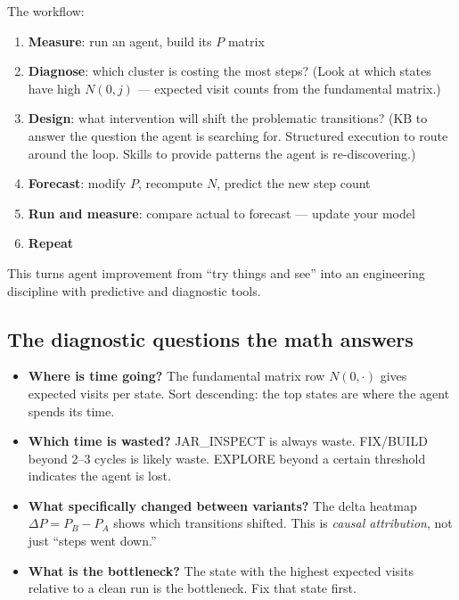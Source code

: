 \documentclass[11pt,a4paper]{article}
\begin{document}
The workflow:
\begin{enumerate}
  \item \textbf{Measure}: run an agent, build its $P$ matrix
  \item \textbf{Diagnose}: which cluster is costing the most steps?
    (Look at which states have high $N(0, j)$ --- expected visit counts from the fundamental matrix.)
  \item \textbf{Design}: what intervention will shift the problematic transitions?
    (KB to answer the question the agent is searching for.
    Structured execution to route around the loop.
    Skills to provide patterns the agent is re-discovering.)
  \item \textbf{Forecast}: modify $P$, recompute $N$, predict the new step count
  \item \textbf{Run and measure}: compare actual to forecast --- update your model
  \item \textbf{Repeat}
\end{enumerate}

This turns agent improvement from ``try things and see'' into an engineering discipline
with predictive and diagnostic tools.

\subsection*{The diagnostic questions the math answers}

\begin{itemize}
  \item \textbf{Where is time going?}
    The fundamental matrix row $N(0, \cdot)$ gives expected visits per state.
    Sort descending: the top states are where the agent spends its time.

  \item \textbf{Which time is wasted?}
    JAR\_INSPECT is always waste. FIX/BUILD beyond 2--3 cycles is likely waste.
    EXPLORE beyond a certain threshold indicates the agent is lost.

  \item \textbf{What specifically changed between variants?}
    The delta heatmap $\Delta P = P_B - P_A$ shows which transitions shifted.
    This is \emph{causal attribution}, not just ``steps went down.''

  \item \textbf{What is the bottleneck?}
    The state with the highest expected visits relative to a clean run is the bottleneck.
    Fix that state first.
\end{itemize}
\end{document}
